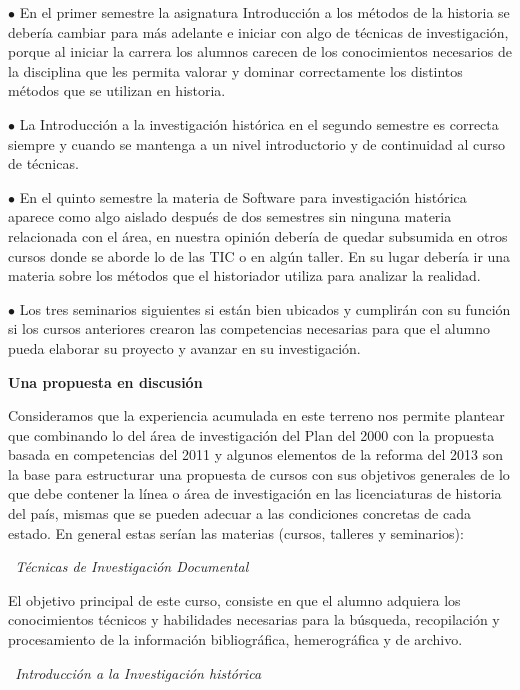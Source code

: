 \begin{Obs}
\item[$\bullet$] En el primer semestre la asignatura Introducción a los métodos de 
la historia se debería cambiar para más adelante e iniciar con algo de 
técnicas de investigación, porque al iniciar la carrera los alumnos 
carecen de los conocimientos necesarios de la disciplina que les 
permita valorar y dominar correctamente los distintos métodos que se 
utilizan en historia. 
\item[$\bullet$] La Introducción a la investigación 
histórica en el segundo semestre es correcta siempre y cuando se 
mantenga a un nivel introductorio y de continuidad al curso de 
técnicas. 
\item[$\bullet$] En el quinto semestre la materia de Software para 
investigación histórica aparece como algo aislado después de dos 
semestres sin ninguna materia relacionada con el área, en nuestra 
opinión debería de quedar subsumida en otros cursos donde se aborde lo 
de las TIC o en algún taller. En su lugar debería ir una materia sobre 
los métodos que el historiador utiliza para analizar la realidad. 
\item[$\bullet$] Los tres seminarios siguientes si están bien ubicados y cumplirán con 
su función si los cursos anteriores crearon las competencias necesarias 
para que el alumno pueda elaborar su proyecto y avanzar en su 
investigación. 
\end{Obs}

\medskip
{\bfseries Una propuesta en discusión}

Consideramos que la experiencia acumulada en este terreno nos permite 
plantear que combinando lo del área de investigación del Plan del 2000 
con la propuesta basada en competencias del 2011 y algunos elementos de 
la reforma del 2013 son la base para estructurar una propuesta de 
cursos con sus objetivos generales de lo que debe contener la línea o 
área de investigación en las licenciaturas de historia del país, mismas 
que se pueden adecuar a las condiciones concretas de cada estado. En 
general estas serían las materias (cursos, talleres y seminarios):

{\itshape\ Técnicas de Investigación  Documental\/}

El objetivo principal de este curso, consiste en que el alumno adquiera 
los conocimientos técnicos y habilidades necesarias para la búsqueda, 
recopilación y procesamiento de la información bibliográfica, 
hemerográfica y de archivo.

{\itshape\ Introducción a la Investigación histórica\/}

